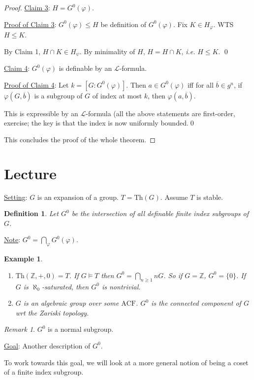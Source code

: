 \documentclass[]{article}
\theoremstyle{custhm}
\theoremstyle{cusdef}
\newtheorem{defin}[theorem]{Definition}
\theoremstyle{custhm}
\theoremstyle{custhm}
\theoremstyle{custhm}
\theoremstyle{ex}
\newtheorem{ex}[theorem]{Example}
\theoremstyle{custhm}
\theoremstyle{cusdef}
\theoremstyle{remark}
\theoremstyle{remark}
\theoremstyle{numremark}
\newtheorem{numremark}[theorem]{Remark}
\newcommand{\Z}{\mathbb{Z}}
\renewcommand{\L}{\mathcal{L}}
\renewcommand{\it}[1]{\textit{#1}}
\renewcommand{\phi}{\varphi}
\renewcommand{\bar}{\overline}
\newcommand{\Th}{\textrm{Th}}
\newcommand{\acf}{\textrm{ACF}}
\begin{document}
\begin{proof}
	\underline{Claim 3}: $H = G^0(\phi)$.
	
	\underline{Proof of Claim 3}: $G^0(\phi) \le H$ be definition of $G^0(\phi)$. Fix $K\in H_\phi$. WTS $H\le K$.

	By Claim 1, $H\cap K\in H_\psi$. By minimality of $H$, $H= H\cap K$, \it{i.e.} $H\le K$. \qed

	\underline{Claim 4}: $G^0(\phi)$ is definable by an $\L$-formula.

	\underline{Proof of Claim 4}: Let $k = [G:G^0(\phi)]$. Then $a\in G^0(\phi)$ iff for all $\bar{b}\in g^n$, if $\phi(G,\bar{b})$ is a subgroup of $G$ of index at most $k$, then $\phi(a,\bar{b})$.

	This is expressible by an $\L$-formula (all the above statements are first-order, exercise; the key is that the index is now uniformly bounded.\qed

	This concludes the proof of the whole theorem.
\end{proof}

\section{Lecture}

\underline{Setting}: $G$ is an expansion of a group. $T = \Th(G)$. Assume $T$ is stable.

\begin{defin}
	Let $G^0$ be the intersection of all definable finite index subgroups of $G$.
\end{defin}
\underline{Note}: $G^0 = \bigcap_{\phi}G^0(\phi)$.

\begin{ex}\ 
	\begin{enumerate}[label = \arabic*)]
		\item $\Th(\Z,+,0) = T$. If $G\models T$ then $G^0 = \bigcap_{n\ge 1}nG$. So if $G = \Z$, $G^0 = \{0\}$. If $G$ is $\aleph_0$-saturated, then $G^0$ is nontrivial.
		\item $G$ is an algebraic group over some $\acf$. $G^0$ is the connected component of $G$ wrt the Zariski topology.
	\end{enumerate}
\end{ex}

\begin{numremark}
	$G^0$ is a normal subgroup.
\end{numremark}
\underline{Goal}: Another description of $G^0$.

To work towards this goal, we will look at a more general notion of being a coset of a finite index subgroup.
\end{document}
